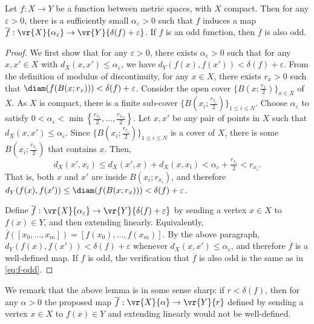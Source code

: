 \documentclass[11pt, reqno, english]{amsart}
\begin{document}
\begin{lemma}
\label{lem:ind-map-modulus-discontinuity}
Let $f\colon X \to Y$ be a function between metric spaces, with $X$ compact.
Then for any $\varepsilon>0$, there is a sufficiently small $\alpha_\varepsilon>0$ such that $f$ induces a map $\overline{f}:\vr{X}{\alpha_\varepsilon}\to \vr{Y}{\delta(f) + \varepsilon}$.
If $f$ is an odd function, then $\overline{f}$ is also odd.
\end{lemma}

\begin{proof}
We first show that for any $\varepsilon>0$, there exists $\alpha_\varepsilon>0$ such that for any $x, x'\in X$ with $d_X(x, x')\leq \alpha_\varepsilon$, we have $d_Y(f(x), f(x'))<\delta(f) + \varepsilon$.
From the definition of modulus of discontinuity, for any $x\in X$, there exists $r_x>0$ such that $\diam(f(B(x; r_x)))< \delta(f) + \varepsilon$.
Consider the open cover $\{B\left(x;\frac{r_x}{2}\right)\}_{x\in X}$ of $X$.
As $X$ is compact, there is a finite sub-cover $\{B\left(x_i; \frac{r_{x_i}}{2}\right)\}_{1\leq i \leq N}$.
Choose $\alpha_\varepsilon$ to satisfy $0<\alpha_\varepsilon<\min\left\{\frac{r_{x_1}}{2},\ldots,\frac{r_{x_N}}{2}\right\}$.
Let $x, x'$ be any pair of points in $X$ such that $d_X(x, x')\leq \alpha_\varepsilon$.
Since $\{B\left(x_i; \frac{r_{x_i}}{2}\right)\}_{1\leq i \leq N}$ is a cover of $X$, there is some $B\left(x_i;\frac{r_{x_i}}{2}\right)$ that contains $x$.
Then, 
\[d_X(x',x_i) \le d_X(x',x)+d_X(x,x_i) < \alpha_\varepsilon + \tfrac{r_{x_i}}{2} < r_{x_i}.\]
That is, both $x$ and $x'$ are inside $B(x_i; r_{x_i})$, and therefore $d_Y(f(x), f(x')) \le \diam(f(B(x; r_x))) <\delta(f) + \varepsilon$.

Define $\overline{f}:\vr{X}{\alpha_\varepsilon}\to \vr{Y}{\delta(f) + \varepsilon}$ by sending a vertex $x\in X$ to $f(x)\in Y$, and then extending linearly.
Equivalently, $\overline{f}([x_0,\ldots,x_m])=[f(x_0),\ldots,f(x_m)]$.
By the above paragraph, $d_Y(f(x), f(x'))< \delta(f) +\varepsilon$ whenever $d_X(x, x')\leq \alpha_\varepsilon$, and therefore $\overline{f}$ is a well-defined map.
If $f$ is odd, the verification that $\overline{f}$ is also odd is the same as in \eqref{eq:f-odd}.
\end{proof}

We remark that the above lemma is in some sense sharp: if $r<\delta(f)$, then for any $\alpha>0$ the proposed map $\overline{f}:\vr{X}{\alpha}\to \vr{Y}{r}$ defined by sending a vertex $x\in X$ to $f(x)\in Y$ and extending linearly would not be well-defined.
\end{document}
